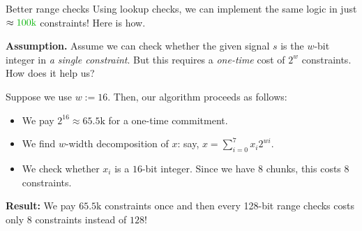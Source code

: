 \documentclass{zkdl-presentation-template}
\begin{document}
    \begin{frame}{Better range checks}
        Using lookup checks, we can implement the same logic in just
        $\approx\textcolor{green!70!black}{100\text{k}}$ constraints! Here is
        how.

        \textbf{Assumption.} Assume we can check whether the given signal $s$ is
        the $w$-bit integer in \textit{a single constraint}. But this requires 
        a \textit{one-time} cost of $2^w$ constraints. How does it help us?

        Suppose we use $w := 16$. Then, our algorithm proceeds as follows:
        \begin{itemize}
            \item We pay $2^{16} \approx 65.5\text{k}$ for a one-time commitment.
            \item We find $w$-width decomposition of $x$: say, $x = \sum_{i=0}^{7}x_i2^{wi}$.
            \item We check whether $x_i$ is a $16$-bit integer. Since we have $8$ chunks,
            this costs $8$ constraints.
        \end{itemize}

        \textbf{Result:} We pay $65.5\text{k}$ constraints once and then every 
        128-bit range checks costs only $8$ constraints instead of $128$!
    \end{frame}
\end{document}
